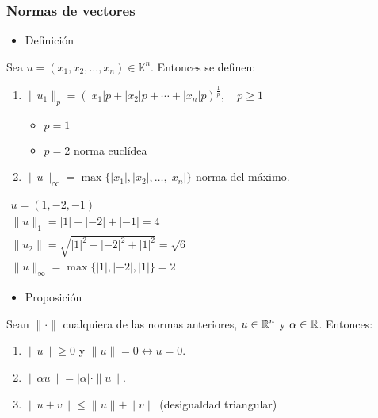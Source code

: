 \subsubsection{Normas de vectores}
\begin{itemize}[label=\color{red}\textbullet, leftmargin=*]
	\item \color{lightblue}Definición
\end{itemize}
Sea $u=(x_1,x_2,\dots,x_n)\in\mathbb{K}^n$. Entonces se definen:
\begin{enumerate}[label=\arabic*)]
	\item $\|u_1\|_p=(|x_1|p+|x_2|p+\cdots+|x_n|p)^{\frac{1}{p}},\quad p\ge1$
	\begin{itemize}
		\item $p=1$
		\item $p=2$ norma euclídea
	\end{itemize}
	\item $\|u\|_\infty=\max\{|x_1|,|x_2|,\dots,|x_n|\}$ norma del máximo.
\end{enumerate}
\Ej

$\begin{array}{l}
	u=(1,-2,-1)\\
	\|u\|_1=|1|+|-2|+|-1|=4\\
	\|u_2\|=\sqrt{|1|^2+|-2|^2+|1|^2}=\sqrt{6}\\
	\|u\|_\infty=\max\{|1|,|-2|,|1|\}=2
\end{array}$
\begin{itemize}[label=\color{red}\textbullet, leftmargin=*]
	\item \color{lightblue}Proposición
\end{itemize}
Sean $\|\cdot\|$ cualquiera de las normas anteriores, $u\in\operatorname{\mathbb{R}}^n$ y $\alpha\in\operatorname{\mathbb{R}}$. Entonces:
\begin{enumerate}[label=\color{lightblue}\arabic*)]
	\item $\|u\|\ge0$ y $\|u\|=0\longleftrightarrow u=0$.
	\item $\|\alpha u\|=|\alpha|\cdot\|u\|$.
	\item $\|u+v\|\le\|u\|+\|v\|$ (desigualdad triangular)
\end{enumerate}
\begin{center}
\end{center}
